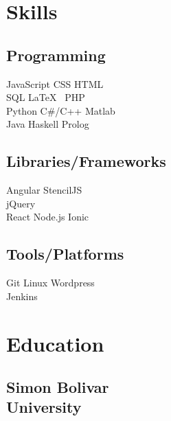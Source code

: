 \documentclass[]{plushcv}
\begin{document}
\begin{minipage}[t]{0.25\textwidth} 


\section{Skills}

\subsection{Programming}
\sectionsep
{}
JavaScript \textbullet{} CSS \textbullet{} HTML \\
\sectionsep
{}
SQL \textbullet{} \LaTeX\ \textbullet{} PHP \\
Python \textbullet{} C\#/C++ \textbullet{} Matlab \\
\sectionsep
{}
Java \textbullet{} Haskell \textbullet{} Prolog \\
\sectionsep
\sectionsep

\subsection{Libraries/Frameworks}
\sectionsep
{}
Angular \textbullet{} StencilJS \\
\sectionsep
{}
jQuery \\
\sectionsep
{}
React \textbullet{} Node.js \textbullet{} Ionic \\
\sectionsep
\sectionsep

\subsection{Tools/Platforms}
\sectionsep
Git \textbullet{} Linux \textbullet{} Wordpress \\
Jenkins \\

\sectionsep


\section{Education} 
\subsection{Simon Bolivar \\ University}
\sectionsep


\end{minipage}
\end{document}
